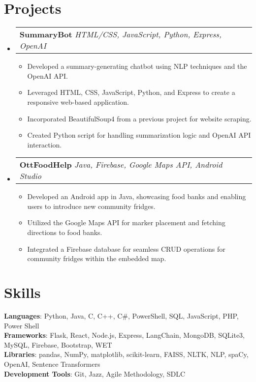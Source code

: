 \documentclass[letterpaper,11pt]{article}
\makeatletter
\newcommand{\resumeItem}[1]{
  \item\small{
    {#1 \vspace{-2pt}}
  }
}
\newcommand{\resumeSubheading}[3]{
    \item
    \begin{tabular*}{0.97\textwidth}[t]{l@{\extracolsep{\fill}}r}
      \textbf{#1} \textbar \textit{ #2} & \textbf{#3} \\
    \end{tabular*}\vspace{-4.5pt}
}
\newcommand{\resumeSubHeadingListStart}{\begin{itemize}[leftmargin=0.15in, label={}]}
\newcommand{\resumeSubHeadingListEnd}{\end{itemize}}
\newcommand{\resumeItemListStart}{\begin{itemize}}
\newcommand{\resumeItemListEnd}{\end{itemize}\vspace{-5pt}}
\makeatother
\begin{document}
\section{\textbf{\Large Projects}}
    \resumeSubHeadingListStart
        \resumeSubheading{SummaryBot}{HTML/CSS, JavaScript, Python, Express, OpenAI}{}
            \resumeItemListStart
                \resumeItem{Developed a summary-generating chatbot using NLP techniques and the OpenAI API.}
                \resumeItem{Leveraged HTML, CSS, JavaScript, Python, and Express to create a responsive web-based application.}
                \resumeItem{Incorporated BeautifulSoup4 from a previous project for website scraping.}
                \resumeItem{Created Python script for handling summarization logic and OpenAI API interaction.}
            \resumeItemListEnd

        \resumeSubheading{OttFoodHelp}{Java, Firebase, Google Maps API, Android Studio}{}
            \resumeItemListStart
            \resumeItem{Developed an Android app in Java, showcasing food banks and enabling users to introduce new community fridges.}
            \resumeItem{Utilized the Google Maps API for marker placement and fetching directions to food banks.}
                \resumeItem{Integrated a Firebase database for seamless CRUD operations for community fridges within the embedded map.}
            \resumeItemListEnd
        \resumeSubHeadingListEnd

\section{\textbf{\Large Skills}}
 \begin{itemize}[leftmargin=0.15in, label={}]
    \small{\item{
     \textbf{Languages}{: Python, Java, C, C++, C\#, PowerShell, SQL, JavaScript, PHP, Power Shell} \\
     \textbf{Frameworks}{: Flask, React, Node.js, Express, LangChain, MongoDB, SQLite3, MySQL, Firebase, Bootstrap, WET} \\
     \textbf{Libraries}{: pandas, NumPy, matplotlib, scikit-learn, FAISS, NLTK, NLP, spaCy, OpenAI, Sentence Transformers} \\
     \textbf{Development Tools}{: Git, Jazz, Agile Methodology, SDLC} \\
    }}
 \end{itemize}


\end{document}
